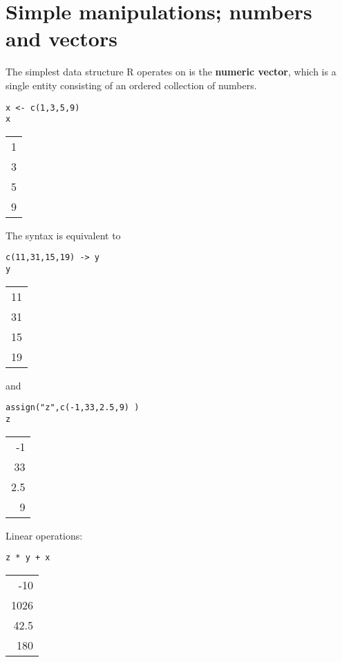 \documentclass[11pt]{article}
\begin{document}
\section{Simple manipulations; numbers and vectors}
\label{sec:org54b4afa}

The simplest data structure R operates on is the \textbf{numeric vector}, which
is a single entity consisting of an ordered collection of numbers.

\begin{verbatim}
x <- c(1,3,5,9)
x
\end{verbatim}

\begin{center}
\begin{tabular}{r}
1\\
3\\
5\\
9\\
\end{tabular}
\end{center}

The syntax is equivalent to 
\begin{verbatim}
c(11,31,15,19) -> y
y
\end{verbatim}

\begin{center}
\begin{tabular}{r}
11\\
31\\
15\\
19\\
\end{tabular}
\end{center}

and 
\begin{verbatim}
assign("z",c(-1,33,2.5,9) )
z
\end{verbatim}

\begin{center}
\begin{tabular}{r}
-1\\
33\\
2.5\\
9\\
\end{tabular}
\end{center}


Linear operations:
\begin{verbatim}
z * y + x
\end{verbatim}

\begin{center}
\begin{tabular}{r}
-10\\
1026\\
42.5\\
180\\
\end{tabular}
\end{center}
\end{document}
